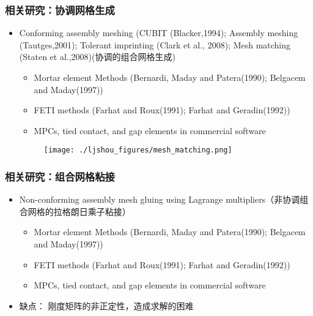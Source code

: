 \documentclass[mathserif]{beamer}
\begin{document}
\begin{CJK}{UTF8}{gkai}
		\begin{frame}
		\frametitle{相关研究：协调网格生成}
		\begin{itemize}
		  \small
		  \item Conforming assembly meshing (CUBIT (Blacker,1994); Assembly meshing (Tautges,2001); Tolerant imprinting (Clark et al., 2008); Mesh matching (Staten et al.,2008)(协调的组合网格生成)
			\begin{itemize}
			\scriptsize
			\item Mortar element Methods (Bernardi, Maday and Patera(1990); Belgacem and Maday(1997))
			\item FETI methods (Farhat and Roux(1991); Farhat and Geradin(1992)) 
			\item MPCs, tied contact, and gap elements in commercial software
		  	\end{itemize}
		  	\begin{figure}
		  		\texttt{[image: ./ljshou\_figures/mesh\_matching.png]}
		  	\end{figure}
		\end{itemize}
	\end{frame}

	\begin{frame}
		\frametitle{相关研究：组合网格粘接}
		\begin{itemize}
		  \item Non-conforming assembly mesh gluing using Lagrange multipliers（非协调组合网格的拉格朗日乘子粘接）
		  \begin{itemize}
		  	\scriptsize
			\item Mortar element Methods (Bernardi, Maday and Patera(1990); Belgacem and Maday(1997))
			\item FETI methods (Farhat and Roux(1991); Farhat and Geradin(1992)) 
			\item MPCs, tied contact, and gap elements in commercial software
		  \end{itemize}
		  \item 缺点： 刚度矩阵的非正定性，造成求解的困难
		\end{itemize}
	\end{frame}

	
	

\end{CJK}
\end{document}
